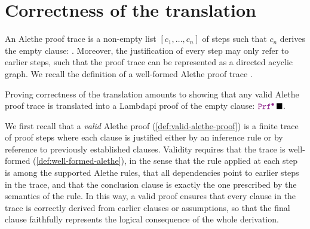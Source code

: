 \chapter{Correctness of the translation}\label{ch:soundness}

An Alethe proof trace is a non-empty list $[c_1, \dots, c_n]$ of steps such that $c_n$ derives the empty clause: .
Moreover, the justification of every step may only refer to earlier steps, such that the proof trace can be represented as a directed acyclic graph.
We recall the definition of a well-formed Alethe proof trace \cite[Def.\ 7.2]{alethespec}.

\smallskip 

Proving correctness of the translation amounts to showing that any valid Alethe proof trace is translated into a Lambdapi proof of the empty clause: $\prfcl\, \nil$.

We first recall that a \emph{valid} Alethe proof (\cref{def:valid-alethe-proof}) is a finite trace of proof steps where each clause is justified either by an inference rule or by reference to previously established clauses.
Validity requires that the trace is well-formed (\cref{def:well-formed-alethe}), in the sense that the rule applied at each step is among the supported Alethe rules, that all dependencies point to earlier steps in the trace, and that the conclusion clause is exactly the one prescribed by the semantics of the rule.
In this way, a valid proof ensures that every clause in the trace is correctly derived from earlier clauses or assumptions, so that the final clause faithfully represents the logical consequence of the whole derivation.

